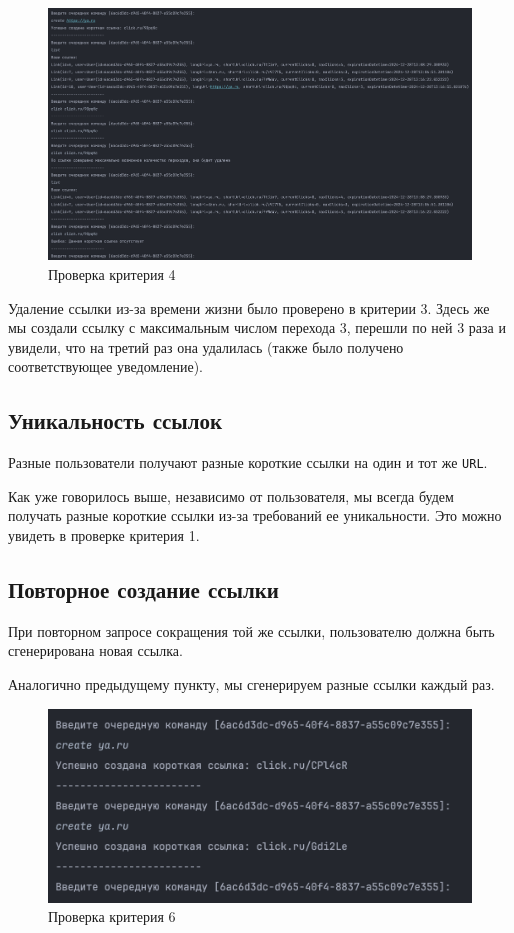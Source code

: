 \documentclass[a4paper, 14pt]{article}
\begin{document}
\begin{figure}[H]
	\centering
	\includegraphics[width=17cm]{resources/8.png}
	\caption{Проверка критерия 4}
\end{figure}

Удаление ссылки из-за времени жизни было проверено в критерии 3. Здесь же мы создали ссылку с максимальным числом перехода 3, перешли по ней 3 раза и увидели, что на третий раз она удалилась (также было получено соответствующее уведомление).

\subsection{Уникальность ссылок}

Разные пользователи получают разные короткие ссылки на один и тот же \texttt{URL}.

Как уже говорилось выше, независимо от пользователя, мы всегда будем получать разные короткие ссылки из-за требований ее уникальности. Это можно увидеть в проверке критерия 1.

\subsection{Повторное создание ссылки}

При повторном запросе сокращения той же ссылки, пользователю должна быть сгенерирована новая ссылка.

Аналогично предыдущему пункту, мы сгенерируем разные ссылки каждый раз.

\begin{figure}[H]
	\centering
	\includegraphics[width=17cm]{resources/9.png}
	\caption{Проверка критерия 6}
\end{figure}
\end{document}
